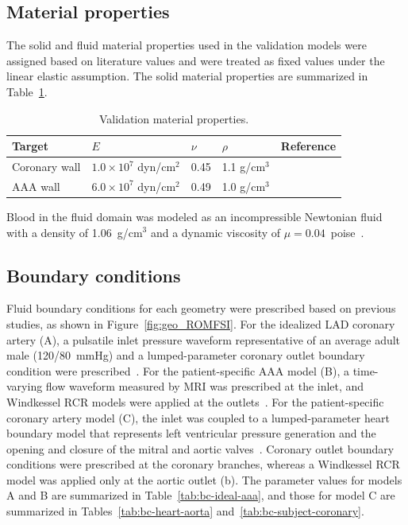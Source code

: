 \documentclass[master,english,final]{kaist-ucs}
\begin{document}
\subsection{Material properties}
The solid and fluid material properties used in the validation models were assigned based on literature values and were treated as fixed values under the linear elastic assumption. The solid material properties are summarized in Table~\ref{tab:validation-material}.

\begin{table}[ht]
\caption[Validation material properties]{Validation material properties.}
\label{tab:validation-material}
\begin{center}
\begin{tabular}{lllll}
\hline\hline
Target & $E$ & $\nu$ & $\rho$ & Reference \\
\hline
Coronary wall & $1.0\times10^{7}$ dyn/cm$^2$ & 0.45 & 1.1 g/cm$^3$ & \cite{cheng1993, hsu2014, chen2021ldl, jiang2022} \\
AAA wall & $6.0\times10^{7}$ dyn/cm$^2$ & 0.49 & 1.0 g/cm$^3$ & \cite{joldes2016, figueroa2006} \\
\hline\hline
\end{tabular}
\end{center}
\end{table}

Blood in the fluid domain was modeled as an incompressible Newtonian fluid with a density of 1.06~g/cm$^3$ and a dynamic viscosity of $\mu=0.04$~poise~\cite{ku1997blood}.

\subsection{Boundary conditions}
Fluid boundary conditions for each geometry were prescribed based on previous studies, as shown in Figure~\ref{fig:geo_ROMFSI}. For the idealized LAD coronary artery (A), a pulsatile inlet pressure waveform representative of an average adult male (120/80~mmHg) and a lumped-parameter coronary outlet boundary condition were prescribed~\cite{guyton2011_av_P, kim2010coronary}. For the patient-specific AAA model (B), a time-varying flow waveform measured by MRI was prescribed at the inlet, and Windkessel RCR models were applied at the outlets~\cite{westerhof2009windkessel}. For the patient-specific coronary artery model (C), the inlet was coupled to a lumped-parameter heart boundary model that represents left ventricular pressure generation and the opening and closure of the mitral and aortic valves~\cite{kim2010coronary}. Coronary outlet boundary conditions were prescribed at the coronary branches, whereas a Windkessel RCR model was applied only at the aortic outlet (b). The parameter values for models A and B are summarized in Table~\ref{tab:bc-ideal-aaa}, and those for model C are summarized in Tables~\ref{tab:bc-heart-aorta} and~\ref{tab:bc-subject-coronary}.
\end{document}
